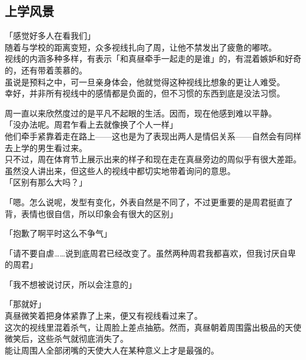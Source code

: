 \subsection{上学风景}

「感觉好多人在看我们」\\

随着与学校的距离变短，众多视线扎向了周，让他不禁发出了疲惫的嘟哝。\\

视线的内涵多种多样，有表示「和真昼牵手一起走的是谁」的，有混着嫉妒和好奇的，还有带着羡慕的。\\

虽说是预料之中，可一旦亲身体会，他就觉得这种视线比想象的更让人难受。\\

幸好，并非所有视线中的感情都是负面的，但不习惯的东西到底是没法习惯。

周一直以来欣然度过的是平凡不起眼的生活。因而，现在他感到难以平静。\\

「没办法呢。周君乍看上去就像换了个人一样」\\

他们牵手紧靠着走在路上——这也是为了表现出两人是情侣关系——自然会有同样去上学的男生看过来。\\

只不过，周在体育节上展示出来的样子和现在走在真昼旁边的周似乎有很大差距。虽然没人讲出来，但这些人的视线中都切实地带着询问的意思。\\

「区别有那么大吗？」

「嗯。怎么说呢，发型有变化，外表自然是不同了，不过更重要的是周君挺直了背，表情也很自信，所以印象会有很大的区别」

「抱歉了啊平时这么不争气」

「请不要自虐……说到底周君已经改变了。虽然两种周君我都喜欢，但我讨厌自卑的周君」

「我不想被说讨厌，所以会注意的」

「那就好」\\

真昼微笑着把身体紧靠了上来，便又有视线看过来了。\\

这次的视线里混着杀气，让周脸上差点抽筋。然而，真昼朝着周围露出极品的天使微笑后，这些杀气就彻底消失了。\\

能让周围人全部闭嘴的天使大人在某种意义上才是最强的。\\

